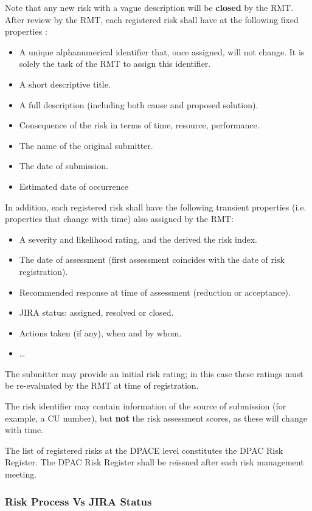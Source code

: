 Note that any new risk with a vague description will be \textbf{closed} by the RMT.
After review by the RMT, each registered risk shall have at the following fixed properties :

\begin{itemize}
\item A unique alphanumerical identifier that, once assigned, will not change.  It is solely the task of the RMT to assign this identifier.
\item A short descriptive title.
\item A full description (including both cause and proposed solution).
\item Consequence of the risk in terms of time, resource, performance.
\item The name of the original submitter.
\item The date of submission.
\item Estimated date of occurrence
\end{itemize}

In addition, each registered risk shall have the following transient properties (i.e. properties that change with time) also assigned by the RMT:
\begin{itemize}
\item A severity and likelihood rating, and the derived the risk index.
\item The date of assessment (first assessment coincides with the date of risk registration).
\item Recommended response at time of assessment (reduction or acceptance).
\item JIRA status: assigned, resolved or closed.
\item Actions taken (if any), when and by whom.
\item \ldots
\end{itemize}

The submitter may provide an initial risk rating; in this case these ratings must be re-evaluated by the RMT at time of registration.

The risk identifier may contain information of the source of submission (for example, a CU number), but \textbf{not} the risk assessment scores, as these will change with time.

The list of registered risks at the DPACE level constitutes the DPAC Risk Register. The DPAC Risk Register shall be reissued after each risk management meeting.

\subsubsection{Risk Process Vs JIRA Status \label{sect:JIRA}}


